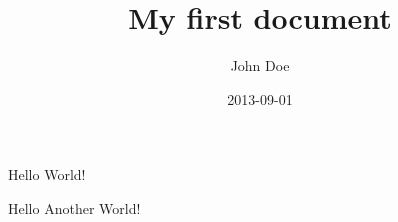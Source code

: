\documentclass{article}
\title{My first document}
\date{2013-09-01}
\author{John Doe}
\begin{document}
\maketitle
\newpage
{}
Hello World!

\newpage
{}
Hello Another World!
\end{document}
